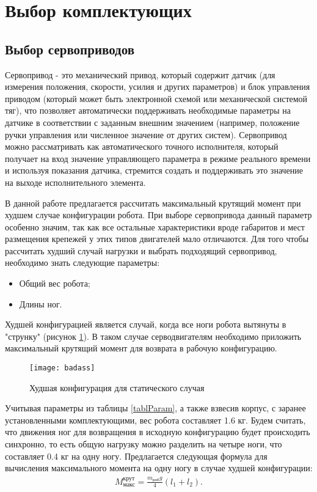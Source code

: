 \section{Выбор комплектующих}\label{C4_4}
	\subsection{Выбор сервоприводов}\label{C4_4_1}
	
Сервопривод - это механический привод, который содержит датчик (для измерения положения, скорости, усилия и других параметров) и блок управления приводом (который может быть электронной схемой или механической системой тяг), что позволяет автоматически поддерживать необходимые параметры на датчике в соответствии с заданным внешним значением (например, положение ручки управления или численное значение от других систем). Сервопривод можно рассматривать как автоматического точного исполнителя, который получает на вход значение управляющего параметра в режиме реального времени и используя показания датчика, стремится создать и поддерживать это значение на выходе исполнительного элемента. 

В данной работе предлагается рассчитать максимальный крутящий момент при худшем случае конфигурации робота. При выборе сервопривода данный параметр особенно значим, так как все остальные характеристики вроде габаритов и мест размещения крепежей у этих типов двигателей мало отличаются. Для того чтобы рассчитать худший случай нагрузки и выбрать подходящий сервопривод, необходимо знать следующие параметры:
\begin{itemize}
	\item Общий вес робота;
	\item Длины ног.
\end{itemize}

Худшей конфигурацией является случай, когда все ноги робота вытянуты в "струнку" (рисунок \ref{badass}). В таком случае серводвигателям необходимо приложить максимальный крутящий момент для возврата в рабочую конфигурацию.

\begin{figure}[h!]
	\begin{center}
		\texttt{[image: badass]}
		\caption{{Худшая конфигурация для статического случая}}
		\label{badass}
	\end{center}
\end{figure}

Учитывая параметры из таблицы \ref{tablParam}, а также взвесив корпус, с заранее установленными комплектующими, вес робота составляет 1.6 кг. Будем считать, что движения ног для возвращения в исходную конфигурацию будет происходить синхронно, то есть общую нагрузку можно разделить на четыре ноги, что составляет 0.4 кг на одну ногу. Предлагается следующая формула для вычисления максимального момента на одну ногу в случае худшей конфигурации:
 \begin{equation}
	\begin{array}{l}
		M^{\text{крут}}_{\text{макс}} = \displaystyle\frac{m_{\text{роб}}g}{4}(l_{1}+l_{2}).
	\end{array}
	\label{max_moment}
\end{equation}


